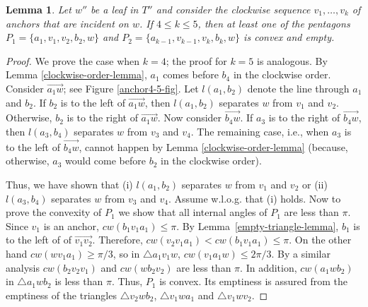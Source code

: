 \documentclass[11pt,a4paper]{article}
\newcommand{\cw}{cw}
\newtheorem{lemma}{Lemma}
\begin{document}
\begin{lemma}
\label{separation-lemma}
Let $w''$ be a leaf in $T''$ and consider the clockwise sequence $v_1,\dots,v_k$ of anchors that are incident on $w$. If $4\le k \le 5$, then at least one of the pentagons $P_1=\{a_1,v_1,v_2,b_2,w\}$ and $P_2=\{a_{k-1},v_{k-1},v_k,b_k,w\}$ is convex and empty.
\end{lemma}
\begin{proof}
We prove the case when $k=4$; the proof for $k=5$ is analogous. By Lemma \ref{clockwise-order-lemma}, $a_1$ comes before $b_4$ in the clockwise order. Consider $\overrightarrow{a_1w}$; see Figure \ref{anchor4-5-fig}. Let $l(a_1, b_2)$ denote the line through $a_1$ and $b_2$. If $b_2$ is to the left of $\overrightarrow{a_1w}$, then $l(a_1, b_2)$ separates $w$ from $v_1$ and $v_2$. Otherwise, $b_2$ is to the right of $\overrightarrow{a_1w}$. Now consider $\overrightarrow{b_4w}$. If $a_3$ is to the right of $\overrightarrow{b_4w}$, then $l(a_3, b_4)$ separates $w$ from $v_3$ and $v_4$. The remaining case, i.e., when $a_3$ is to the left of $\overrightarrow{b_4w}$, cannot happen by Lemma \ref{clockwise-order-lemma} (because, otherwise, $a_3$ would come before $b_2$ in the clockwise order).

Thus, we have shown that (i) $l(a_1, b_2)$ separates $w$ from $v_1$ and $v_2$ or (ii) $l(a_3, b_4)$ separates $w$ from $v_3$ and $v_4$. Assume w.l.o.g. that (i) holds. Now to prove the convexity of $P_1$ we show that all internal angles of $P_1$ are less than $\pi$. Since $v_1$ is an anchor, $\cw(b_1v_1a_1)\le \pi$. By Lemma~\ref{empty-triangle-lemma}, $b_1$ is to the left of of $\overrightarrow{v_1v_2}$. Therefore, $\cw(v_2v_1a_1) < \cw(b_1v_1a_1) \le \pi$. On the other hand $cw(wv_1a_1)\ge \pi/3$, so in $\bigtriangleup a_1v_1w$, $\cw(v_1a_1w) \le 2\pi/3$. By a similar analysis $\cw(b_2v_2v_1)$ and $\cw(wb_2v_2)$ are less than $\pi$. In addition, $\cw(a_1wb_2)$ in $\bigtriangleup a_1wb_2$ is less than $\pi$. Thus, $P_1$ is convex. Its emptiness is assured from the emptiness of the triangles $\bigtriangleup v_2wb_2$, $\bigtriangleup v_1wa_1$ and $\bigtriangleup v_1wv_2$.
\end{proof}
\end{document}
